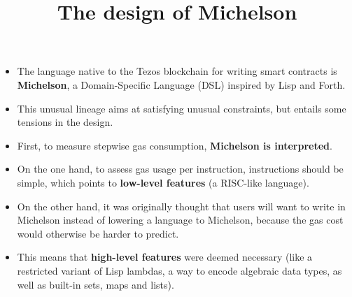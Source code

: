 \documentclass[wide]{slides}
\begin{document}
\begin{slide}
  \title{The design of Michelson}

  \begin{itemize}

    \item The language native to the Tezos blockchain for writing
      smart contracts is \textbf{Michelson}, a Domain-Specific
      Language (DSL) inspired by Lisp and Forth.

    \item This unusual lineage aims at satisfying unusual constraints,
      but entails some tensions in the design.

    \item First, to measure stepwise gas consumption,
      \textbf{Michelson is interpreted}.

    \item On the one hand, to assess gas usage per instruction,
      instructions should be simple, which points to \textbf{low-level
        features} (a RISC-like language).

    \item On the other hand, it was originally thought that users will
      want to write in Michelson instead of lowering a language to
      Michelson, because the gas cost would otherwise be harder to
      predict.

    \item This means that \textbf{high-level features} were deemed
      necessary (like a restricted variant of Lisp lambdas, a way to
      encode algebraic data types, as well as built-in sets, maps and
      lists).

  \end{itemize}

\end{slide}
\end{document}
